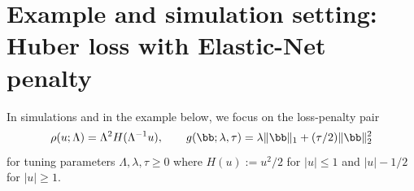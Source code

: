 \documentclass{colt2022} %
\numberwithin{equation}{section}
\begin{document}
\section{Example and simulation setting: Huber loss with Elastic-Net penalty}
\label{sec:simulations}

In simulations and in the example below, we focus on the loss-penalty pair
\begin{equation}
    \rho(u; \Lambda) = \Lambda^{2} H ( \Lambda^{-1} u ),
    \qquad
    g(\bb; \lambda, \tau) = \lambda \| \bb \|_{1}
                           + (\tau / 2) \| \bb \|_{2}^{2} 
                           \label{eq:choice-loss-penalty}
\end{equation}
for tuning parameters $\Lambda,\lambda,\tau\ge 0$ where $H(u):= u^{2} / 2$ for $ |u| \leq 1$ and $|u| -1/2$ for $|u|\geq1$.
\end{document}
